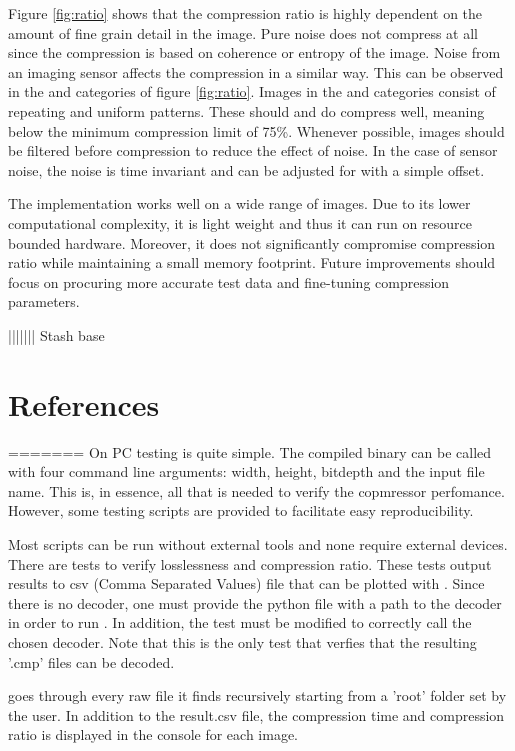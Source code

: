 \documentclass[12pt, a4paper]{article}
\begin{document}
\medskip
\noindent
Figure \ref{fig:ratio} shows that the compression ratio is highly dependent on the amount of fine grain detail in the image. 
Pure noise does not compress at all since the compression is based on coherence or entropy of the image. 
Noise from an imaging sensor affects the compression in a similar way. 
This can be observed in the  and  categories of figure \ref{fig:ratio}. 
Images in the  and  categories consist of repeating and uniform patterns. 
These should and do compress well, meaning below the minimum compression limit of 75\%.
Whenever possible, images should be filtered before compression to reduce the effect of noise. 
In the case of sensor noise, the noise is time invariant and can be adjusted for with a simple offset.

\medskip
\noindent
The implementation works well on a wide range of images. 
Due to its lower computational complexity, it is light weight and thus it can run on resource bounded hardware. 
Moreover, it does not significantly compromise compression ratio while maintaining a small memory footprint. 
Future improvements should focus on procuring more accurate test data and fine-tuning compression parameters. 


||||||| Stash base
\section{References}
\listoffigures


=======
On PC testing is quite simple. 
The compiled binary  can be called with four command line arguments: 
width, height, bitdepth and the input file name. 
This is, in essence, all that is needed to verify the copmressor perfomance. 
However, some testing scripts are provided to facilitate easy reproducibility. 

\medskip
\noindent
Most scripts can be run without external tools and none require external devices.
There are tests to verify losslessness and compression ratio. 
These tests output results to csv (Comma Separated Values) file that can be plotted with . 
Since there is no decoder, 
one must provide the python file with a path to the decoder in order to run . 
In addition, the test must be modified to correctly call the chosen decoder.
Note that this is the only test that verfies that the resulting '.cmp' files can be decoded. 

\medskip
\noindent
{} goes through every raw file it finds recursively starting from a 'root' folder set by the user.
In addition to the result.csv file, the compression time and compression ratio is displayed in the console for each image.
\end{document}
